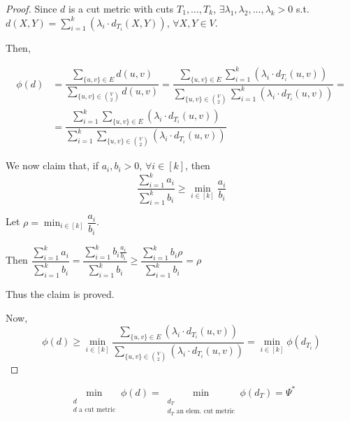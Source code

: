     \begin{proof}
        Since $d$ is a cut metric with cuts $T_1, \dots, T_k$, $\exists \lambda_1, \lambda_2, \dots, \lambda_k > 0$ s.t. $d(X,Y) = \sum_{i=1}^k(\lambda_i \cdot d_{T_i}(X,Y))$, $\forall X,Y \in V$.

        Then,

        \begin{equation*}
            \begin{split}
                \phi(d) &= \dfrac{\sum_{\{u,v\} \in E} d(u,v)}{\sum_{\{u,v\} \in \binom{V}{2}} d(u,v)} = \dfrac{\sum_{\{u,v\} \in E} \sum_{i=1}^{k} (\lambda_i \cdot d_{T_i}(u,v))}{\sum_{\{u,v\} \in \binom{V}{2}} \sum_{i=1}^{k} (\lambda_i \cdot d_{T_i}(u,v))} =\\
                        &= \dfrac{\sum_{i=1}^{k} \sum_{\{u,v\} \in E} (\lambda_i \cdot d_{T_i}(u,v))}{\sum_{i=1}^{k} \sum_{\{u,v\} \in \binom{V}{2}} (\lambda_i \cdot d_{T_i}(u,v))}
            \end{split}
        \end{equation*}

        We now claim that, if $a_i, b_i > 0$, $\forall i \in [k]$, then
        \[ \dfrac{\sum_{i=1}^k a_i}{\sum_{i=1}^k b_i} \geq \min_{i \in [k]} \dfrac{a_i}{b_i} \]

        Let $\rho = \min_{i \in [k]} \dfrac{a_i}{b_i}$.

        Then
        $\dfrac{\sum_{i=1}^k a_i}{\sum_{i=1}^k b_i} = 
        \dfrac{\sum_{i=1}^k b_i \frac{a_i}{b_i}}{\sum_{i=1}^k b_i} \geq
        \dfrac{\sum_{i=1}^k b_i \rho}{\sum_{i=1}^k b_i} =
        \rho$

        Thus the claim is proved.

        Now,
        \[ \phi(d) \geq \min_{i \in [k]} \dfrac{\sum_{\{u,v\} \in E} (\lambda_i \cdot d_{T_i}(u,v))}{\sum_{\{u,v\} \in \binom{V}{2}} (\lambda_i \cdot d_{T_i}(u,v))} = \min_{i \in [k]} \phi(d_{T_i}) \]
    \end{proof}

    \begin{corollary}
        \[ \min_{\substack{d\\ d \text{  a cut metric}}} \phi(d) = \min_{\substack{d_T\\ d_T \text{ an elem. cut metric}}} \phi(d_T) = \Psi^*  \]
    \end{corollary}

